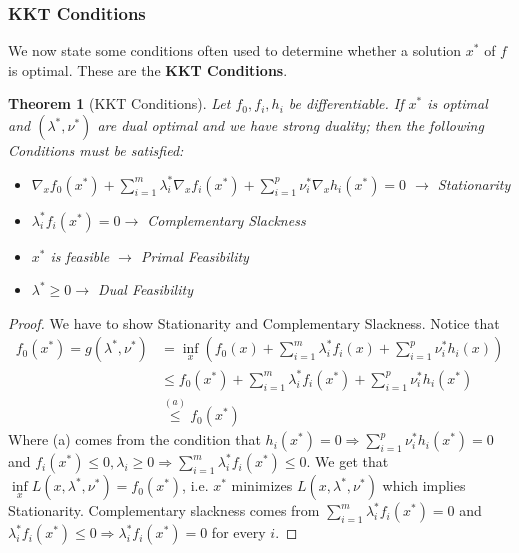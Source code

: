 \documentclass[]{article}
\theoremstyle{mattstyle}
\newtheorem{theorem}{Theorem}[section]
\theoremstyle{definition}
\begin{document}
\subsubsection{KKT Conditions}

We now state some conditions often used to determine whether a solution $x^*$ of $f$ is optimal. These are the \textbf{KKT Conditions}.

\begin{theorem}[KKT Conditions]
	Let $f_0, f_i, h_i$ be differentiable. If $x^*$ is optimal and $(\lambda^*, \nu^*)$ are dual optimal and we have strong duality; then the following Conditions must be satisfied:
	\begin{itemize}
		\item $\nabla_x f_0(x^*) + \sum_{i=1}^m \lambda_i^* \nabla_x f_i(x^*) + \sum_{i=1}^p \nu_i^* \nabla_x h_i(x^*) = 0$ $\rightarrow$ Stationarity
		\item $\lambda_i^* f_i(x^*)=0 \rightarrow$ Complementary Slackness
		\item $x^*$ is feasible $\rightarrow$ Primal Feasibility
		\item $\lambda^* \ge 0 \rightarrow$ Dual Feasibility
	\end{itemize}
\end{theorem}
\begin{proof}
	We have to show Stationarity and Complementary Slackness. Notice that
	\begin{align}
	f_{0}(x^*) = g(\lambda^*, \nu^*) &= \inf_x \left( f_0(x) + \sum_{i=1}^m \lambda_i^*f_i(x) + \sum_{i=1}^p \nu_i^* h_i(x) \right) \\
	&\le f_0(x^*) + \sum_{i=1}^m \lambda_i^*f_i(x^*) + \sum_{i=1}^p \nu_i^* h_i(x^*)\\
	&\overset{(a)}{\le} f_0(x^*)
	\end{align}
	Where (a) comes from the condition that $h_i(x^*) = 0 \Rightarrow \sum_{i=1}^p \nu_i^* h_i(x^*) = 0$ and $f_i(x^*) \le 0, \lambda_i \ge 0 \Rightarrow \sum_{i=1}^m \lambda_i^* f_i(x^*) \le 0$. We get that $\inf\limits_{x} L(x, \lambda^*, \nu^*) = f_0(x^*)$, i.e. $x^*$ minimizes $L(x, \lambda^*, \nu^*)$ which implies Stationarity. Complementary slackness comes from $\sum_{i=1}^m \lambda_i^* f_i(x^*) = 0$ and $\lambda_i^* f_i(x^*) \le 0 \Rightarrow \lambda_i^* f_i(x^*) = 0$ for every $i$.
\end{proof}
\end{document}
